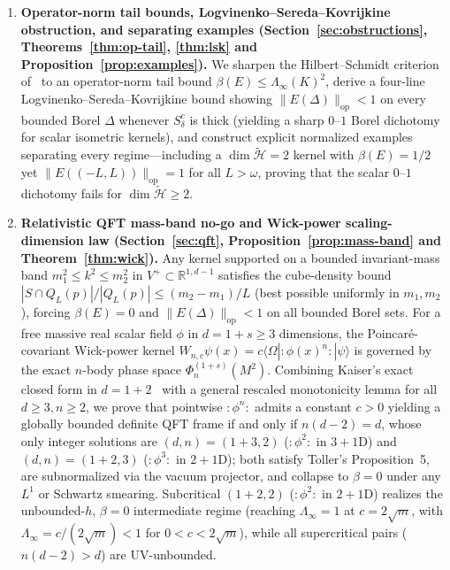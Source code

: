\documentclass[11pt,a4paper]{article}
\theoremstyle{definition}
\theoremstyle{remark}
\newcommand{\tH}{\widetilde{\mathcal{H}}}
\newcommand{\RR}{\mathbb{R}}
\newcommand{\op}{\mathrm{op}}
\newcommand{\ket}[1]{|#1\rangle}
\newcommand{\bra}[1]{\langle #1|}
\newcommand{\norm}[1]{\|#1\|}
\begin{document}
\begin{enumerate}[leftmargin=*,nosep]
\item \textbf{Operator-norm tail bounds, Logvinenko--Sereda--Kovrijkine obstruction, and separating examples (Section~\ref{sec:obstructions}, Theorems~\ref{thm:op-tail}, \ref{thm:lsk} and Proposition~\ref{prop:examples}).} We sharpen the Hilbert--Schmidt criterion of~\cite[Cor.~2.8]{FewsterLoveridge2026} to an operator-norm tail bound $\beta(E)\le \Lambda_\infty(K)^2$, derive a four-line Logvinenko--Sereda--Kovrijkine bound showing $\norm{E(\Delta)}_{\op}<1$ on every bounded Borel $\Delta$ whenever $S_\delta^c$ is thick (yielding a sharp $0$--$1$ Borel dichotomy for scalar isometric kernels), and construct explicit normalized examples separating every regime---including a $\dim\tH=2$ kernel with $\beta(E)=1/2$ yet $\norm{E((-L,L))}_{\op}=1$ for all $L>\omega$, proving that the scalar $0$--$1$ dichotomy fails for $\dim\tH\ge 2$.
\item \textbf{Relativistic QFT mass-band no-go and Wick-power scaling-dimension law (Section~\ref{sec:qft}, Proposition~\ref{prop:mass-band} and Theorem~\ref{thm:wick}).} Any kernel supported on a bounded invariant-mass band $m_1^2\le k^2\le m_2^2$ in $V^+\subset\RR^{1,d-1}$ satisfies the cube-density bound $|S\cap Q_L(p)|/|Q_L(p)|\le (m_2-m_1)/L$ (best possible uniformly in $m_1,m_2$), forcing $\beta(E)=0$ and $\norm{E(\Delta)}_{\op}<1$ on all bounded Borel sets. For a free massive real scalar field $\phi$ in $d=1+s\ge 3$ dimensions, the Poincar\'e-covariant Wick-power kernel $W_{n,c}\psi(x)=c\bra{\Omega}:\!\phi(x)^n\!:\ket{\psi}$ is governed by the exact $n$-body phase space $\Phi_n^{(1+s)}(M^2)$. Combining Kaiser's exact closed form in $d=1+2$~\cite{Kaiser2025} with a general rescaled monotonicity lemma for all $d\ge 3, n\ge 2$, we prove that pointwise $:\!\phi^n\!:$ admits a constant $c>0$ yielding a globally bounded definite QFT frame if and only if $n(d-2)=d$, whose only integer solutions are $(d,n)=(1+3,2)$ ($:\!\phi^2\!:$ in $3+1$D) and $(d,n)=(1+2,3)$ ($:\!\phi^3\!:$ in $2+1$D); both satisfy Toller's Proposition~5, are subnormalized via the vacuum projector, and collapse to $\beta=0$ under any $L^1$ or Schwartz smearing. Subcritical $(1+2,2)$ ($:\!\phi^2\!:$ in $2+1$D) realizes the unbounded-$h$, $\beta=0$ intermediate regime (reaching $\Lambda_\infty=1$ at $c=2\sqrt{m}$, with $\Lambda_\infty=c/(2\sqrt{m})<1$ for $0<c<2\sqrt{m}$), while all supercritical pairs ($n(d-2)>d$) are UV-unbounded.
\end{enumerate}

\end{document}
